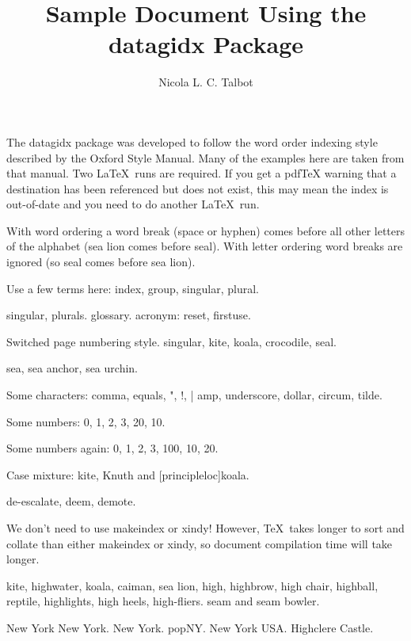 \documentclass{article}
\title{Sample Document Using the datagidx Package}
\author{Nicola L. C. Talbot}
\begin{document}

The datagidx package was developed to follow the word order indexing
style described by the Oxford Style Manual. Many of the examples
here are taken from that manual. Two \LaTeX\ runs are required. If
you get a pdfTeX warning that a destination has been referenced but
does not exist, this may mean the index is out-of-date and you need
to do another \LaTeX\ run.

With word ordering a word break (space or hyphen) comes before all
other letters of the alphabet (\gls{sea lion} comes before \gls{seal}). 
With letter ordering word breaks are ignored (so \gls{seal} comes
before \gls{sea lion}).

Use a few terms here: \gls{index}, \gls{group}, \gls{singular}, \gls{plural}.

\newpage

\Gls{singular}, \glspl{plural}. \gls{glossary}.
\Gls{acronym}: \gls{reset}, \gls{firstuse}.

\newpage
{}

Switched page numbering style. \Gls{singular}, \gls{kite},
\gls{koala}, \gls{crocodile}, \gls{seal}.

\Gls{sea},
\gls{sea anchor},
\gls{sea urchin}.

Some characters: \gls{comma}, \gls{equals}, \gls{"}, \gls{!}, \gls{|}
\gls{amp}, \gls{underscore}, \gls{dollar}, \gls{circum},
\gls{tilde}.

Some numbers: \gls{0}, \gls{1}, \gls{2}, \gls{3}, \gls{20}, \gls{10}.

\newpage

Some numbers again: \gls{0}, \gls{1}, \gls{2}, \gls{3}, \gls{100},
\gls{10}, \gls{20}.

Case mixture: \gls{kite}, 
\gls{Knuth} and 
\gls{[principleloc]koala}.

\Gls{de-escalate}, \gls{deem}, \gls{demote}.

We don't need to use \gls{makeindex} or \gls{xindy}!
However, \TeX\ takes longer to sort and collate than either
\gls{makeindex} or \gls{xindy}, so document compilation time will
take longer.

\newpage

\Gls{kite}, \gls{highwater}, \gls{koala}, \gls{caiman}, \gls{sea
lion}, \gls{high},
\gls{highbrow}, \gls{high chair}, \gls{highball}, \gls{reptile},
\gls{highlights}, \gls{high heels}, \gls{high-fliers}.
\Gls{seam} and \gls{seam bowler}.

\gls{New York New York}. \gls{New York}. 
\Gls{popNY}. \gls{New York USA}.
\gls{Highclere Castle}.
\end{document}
